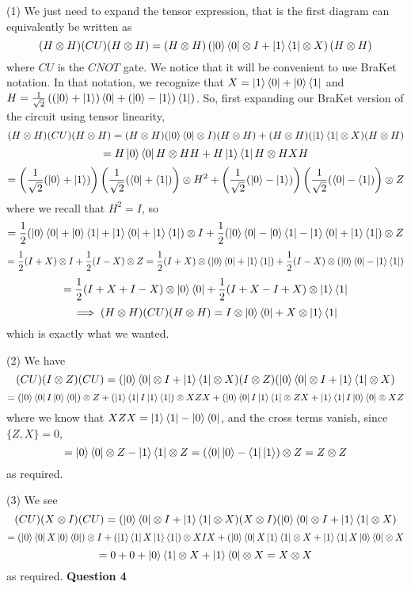 \documentclass[10pt]{article}
\begin{document}
(1) We just need to expand the tensor expression, that is the first diagram can equivalently be written as
\[ (H \otimes H)(CU)(H \otimes H) = (H \otimes H)\left(\ket{0}\bra{0}\otimes I + \ket{1}\bra{1}\otimes X\right)(H\otimes H) \]
where $CU$ is the $CNOT$ gate. We notice that it will be convenient to use BraKet notation. In that notation, we recognize that $X = \ket{1}\bra{0} + \ket{0}\bra{1}$ and $H = \frac{1}{\sqrt{2}}\left((\ket{0} + \ket{1})\bra{0} + (\ket{0} - \ket{1})\bra{1}\right)$. So, first expanding our BraKet version of the circuit using tensor linearity,
\[ (H \otimes H)(CU)(H \otimes H) = (H\otimes H)(\ket{0}\bra{0}\otimes I)(H\otimes H) + (H\otimes H)(\ket{1}\bra{1}\otimes X)(H\otimes H)\]
\[ = H\ket{0}\bra{0}H\otimes HH + H\ket{1}\bra{1}H\otimes HXH\]
\[ = \left(\frac{1}{\sqrt{2}}(\ket{0}+\ket{1})\right)\left(\frac{1}{\sqrt{2}}(\bra{0} + \bra{1})\right) \otimes H^{2} + \left(\frac{1}{\sqrt{2}}(\ket{0}-\ket{1})\right)\left(\frac{1}{\sqrt{2}}(\bra{0} - \bra{1})\right)\otimes Z \]
where we recall that $H^{2} = I$, so
\[ = \frac{1}{2}(\ket{0}\bra{0} + \ket{0}\bra{1} + \ket{1}\bra{0} + \ket{1}\bra{1})\otimes I + \frac{1}{2}(\ket{0}\bra{0} - \ket{0}\bra{1} - \ket{1}\bra{0} + \ket{1}\bra{1})\otimes Z\]
\[ = \frac{1}{2}(I + X)\otimes I + \frac{1}{2}(I - X)\otimes Z = \frac{1}{2}(I + X)\otimes (\ket{0}\bra{0} + \ket{1}\bra{1}) + \frac{1}{2}(I - X)\otimes (\ket{0}\bra{0} - \ket{1}\bra{1}) \]
\[ = \frac{1}{2}(I + X + I - X)\otimes \ket{0}\bra{0} + \frac{1}{2}(I + X - I + X)\otimes \ket{1}\bra{1} \]
\[ \implies (H \otimes H)(CU)(H \otimes H) = I\otimes \ket{0}\bra{0} + X\otimes \ket{1}\bra{1} \]
which is exactly what we wanted.

(2) We have
\[ (CU)(I \otimes Z)(CU) = (\ket{0}\bra{0}\otimes I + \ket{1}\bra{1}\otimes X)(I \otimes Z)(\ket{0}\bra{0}\otimes I + \ket{1}\bra{1}\otimes X) \]
\[ = (\ket{0}\bra{0}I\ket{0}\bra{0}) \otimes Z + (\ket{1}\bra{1}I\ket{1}\bra{1})\otimes XZX + (\ket{0}\bra{0}I\ket{1}\bra{1}\otimes ZX + \ket{1}\bra{1}I\ket{0}\bra{0}\otimes XZ\]
where we know that $XZX = \ket{1}\bra{1} - \ket{0}\bra{0}$, and the cross terms vanish, since $\{Z,X\} = 0$, 
\[ = \ket{0}\bra{0} \otimes Z - \ket{1}\bra{1}\otimes Z = (\bra{0}\ket{0} - \bra{1}\ket{1})\otimes Z = Z\otimes Z\]
as required.

(3) We see
\[ (CU)(X\otimes I)(CU) = (\ket{0}\bra{0}\otimes I + \ket{1}\bra{1}\otimes X)(X \otimes I)(\ket{0}\bra{0}\otimes I + \ket{1}\bra{1}\otimes X) \]
\[ = (\ket{0}\bra{0}X\ket{0}\bra{0}) \otimes I + (\ket{1}\bra{1}X\ket{1}\bra{1})\otimes XIX + (\ket{0}\bra{0}X\ket{1}\bra{1}\otimes X + \ket{1}\bra{1}X\ket{0}\bra{0}\otimes X\]
\[ = 0 + 0 + \ket{0}\bra{1}\otimes X + \ket{1}\bra{0}\otimes X = X\otimes X\]
as required.
\newpage
\textbf{Question 4}
\end{document}
